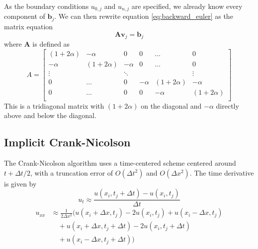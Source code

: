 \documentclass[reprint, english,notitlepage,nofootinbib]{revtex4-1}  %
\newcommand{\vc}[1]{\mathbf{#1}}
\begin{document}
As the boundary conditions $u_{0, j}$ and $u_{n, j}$ are specified, we already know every component of $\vc b_j$. We can then rewrite equation \eqref{eq:backward_euler} as the matrix equation
\begin{equation}
  \label{eq:backward_euler_matrix}
  \vc A \vc v_j = \vc b_j
\end{equation}
where $\vc A$ is defined as
\begin{equation}
  \label{def:matrix_A}
  A =
  \begin{bmatrix}
    (1 + 2 \alpha) & -\alpha         & 0       & 0      & \ldots         & 0 \\
    -\alpha        & (1 + 2 \alpha)  & -\alpha & 0      & \ldots         & 0 \\
    \vdots         &                 & \ddots  &        &                & \vdots \\
    0              & \ldots          & 0       &-\alpha & (1 + 2 \alpha) & -\alpha  \\
    0              & \ldots          & 0       & 0      &-\alpha         & (1 + 2 \alpha)  \\
  \end{bmatrix}
\end{equation}
This is a tridiagonal matrix with $(1 + 2 \alpha)$ on the diagonal and $-\alpha$ directly above and below the diagonal.


\subsection*{Implicit Crank-Nicolson}

The Crank-Nicolson algorithm uses a time-centered scheme centered around $t + \Delta t/2$, with a truncation error of $O(\Delta t^2)$ and $O(\Delta x^2)$. The time derivative is given by
\begin{equation}
  \label{eq:forward_deriv_time}
  u_t \approx \frac{u(x_i, t_j + \Delta t) - u(x_i, t_j)}{\Delta t}
\end{equation}
\begin{align*}
	u_{xx} &\approx \frac{1}{2 \Delta x^2} \bigg(u(x_i+\Delta x, t_j) - 2u(x_i,t_j) + u(x_i-\Delta x, t_j) \\
  	&\quad + u(x_i+\Delta x, t_j + \Delta t) - 2u(x_i, t_j + \Delta t) \\
  	&\quad + u(x_i - \Delta x, t_j + \Delta t) \bigg)
\end{align*}
\end{document}
